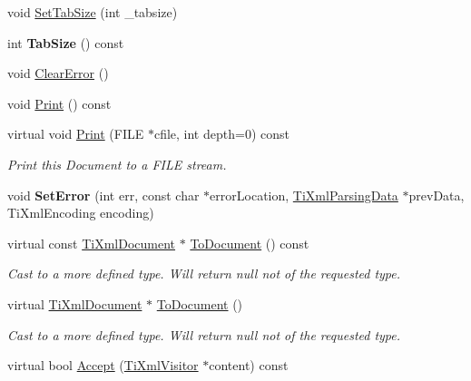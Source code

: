 \begin{DoxyCompactItemize}
void \hyperlink{class_ti_xml_document_a51dac56316f89b35bdb7d0d433ba988e}{Set\+Tab\+Size} (int \+\_\+tabsize)
\item 
\mbox{\label{class_ti_xml_document_a81e6ffeee8f5d025a171eabf79abdad7}} 
int {\bfseries Tab\+Size} () const
\item 
void \hyperlink{class_ti_xml_document_ac66b8c28db86363315712a3574e87c35}{Clear\+Error} ()
\item 
void \hyperlink{class_ti_xml_document_aa4e8c1498a76dcde7191c683e1220882}{Print} () const
\item 
\mbox{\label{class_ti_xml_document_aa9e166fae51da603641380a964f21eeb}} 
virtual void \hyperlink{class_ti_xml_document_aa9e166fae51da603641380a964f21eeb}{Print} (F\+I\+LE $\ast$cfile, int depth=0) const
\begin{DoxyCompactList}\small\item\em Print this Document to a F\+I\+LE stream. \end{DoxyCompactList}\item 
\mbox{\label{class_ti_xml_document_a735c23e318597b920c94eae77fa206de}} 
void {\bfseries Set\+Error} (int err, const char $\ast$error\+Location, \hyperlink{class_ti_xml_parsing_data}{Ti\+Xml\+Parsing\+Data} $\ast$prev\+Data, Ti\+Xml\+Encoding encoding)
\item 
\mbox{\label{class_ti_xml_document_a468e582640e3c4f740f7168d8b4a6e4a}} 
virtual const \hyperlink{class_ti_xml_document}{Ti\+Xml\+Document} $\ast$ \hyperlink{class_ti_xml_document_a468e582640e3c4f740f7168d8b4a6e4a}{To\+Document} () const
\begin{DoxyCompactList}\small\item\em Cast to a more defined type. Will return null not of the requested type. \end{DoxyCompactList}\item 
\mbox{\label{class_ti_xml_document_a1025d942a1f328fd742d545e37efdd42}} 
virtual \hyperlink{class_ti_xml_document}{Ti\+Xml\+Document} $\ast$ \hyperlink{class_ti_xml_document_a1025d942a1f328fd742d545e37efdd42}{To\+Document} ()
\begin{DoxyCompactList}\small\item\em Cast to a more defined type. Will return null not of the requested type. \end{DoxyCompactList}\item 
virtual bool \hyperlink{class_ti_xml_document_a8ddd6eec722cbd25900bbac664909bac}{Accept} (\hyperlink{class_ti_xml_visitor}{Ti\+Xml\+Visitor} $\ast$content) const
\end{DoxyCompactItemize}
